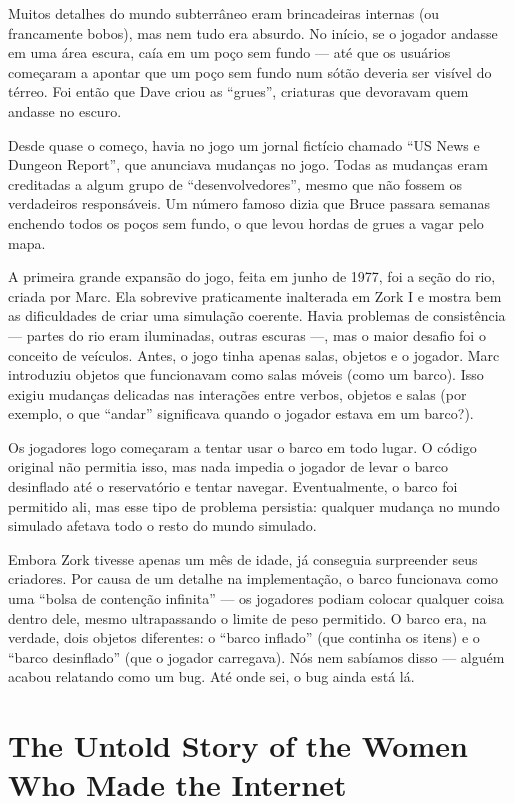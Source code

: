 \documentclass[12pt,a4paper]{article}
\begin{document}
Muitos detalhes do mundo subterrâneo eram brincadeiras internas (ou francamente bobos), mas nem tudo era absurdo. No início, se o jogador andasse em uma área escura, caía em um poço sem fundo — até que os usuários começaram a apontar que um poço sem fundo num sótão deveria ser visível do térreo. Foi então que Dave criou as “grues”, criaturas que devoravam quem andasse no escuro.

Desde quase o começo, havia no jogo um jornal fictício chamado “US News e Dungeon Report”, que anunciava mudanças no jogo. Todas as mudanças eram creditadas a algum grupo de “desenvolvedores”, mesmo que não fossem os verdadeiros responsáveis. Um número famoso dizia que Bruce passara semanas enchendo todos os poços sem fundo, o que levou hordas de grues a vagar pelo mapa.

A primeira grande expansão do jogo, feita em junho de 1977, foi a seção do rio, criada por Marc. Ela sobrevive praticamente inalterada em Zork I e mostra bem as dificuldades de criar uma simulação coerente.
Havia problemas de consistência — partes do rio eram iluminadas, outras escuras —, mas o maior desafio foi o conceito de veículos.
Antes, o jogo tinha apenas salas, objetos e o jogador. Marc introduziu objetos que funcionavam como salas móveis (como um barco). Isso exigiu mudanças delicadas nas interações entre verbos, objetos e salas (por exemplo, o que “andar” significava quando o jogador estava em um barco?).

Os jogadores logo começaram a tentar usar o barco em todo lugar. O código original não permitia isso, mas nada impedia o jogador de levar o barco desinflado até o reservatório e tentar navegar. Eventualmente, o barco foi permitido ali, mas esse tipo de problema persistia: qualquer mudança no mundo simulado afetava todo o resto do mundo simulado.

Embora Zork tivesse apenas um mês de idade, já conseguia surpreender seus criadores. Por causa de um detalhe na implementação, o barco funcionava como uma “bolsa de contenção infinita” — os jogadores podiam colocar qualquer coisa dentro dele, mesmo ultrapassando o limite de peso permitido. O barco era, na verdade, dois objetos diferentes: o “barco inflado” (que continha os itens) e o “barco desinflado” (que o jogador carregava).
Nós nem sabíamos disso — alguém acabou relatando como um bug. Até onde sei, o bug ainda está lá.

\section{The Untold Story of the Women Who Made the Internet}
\textcite{evans2018broadband}
\end{document}
